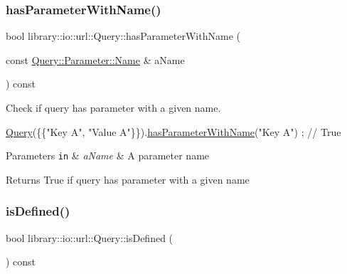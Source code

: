 \subsubsection{\texorpdfstring{has\+Parameter\+With\+Name()}{hasParameterWithName()}}
{\footnotesize\ttfamily bool library\+::io\+::url\+::\+Query\+::has\+Parameter\+With\+Name (\begin{DoxyParamCaption}\item[{const \hyperlink{classlibrary_1_1io_1_1url_1_1_query_1_1_parameter_a7edf5fb8a4ae57aed1ce5dfa2405c981}{Query\+::\+Parameter\+::\+Name} \&}]{a\+Name }\end{DoxyParamCaption}) const}



Check if query has parameter with a given name. 


\begin{DoxyCode}
\hyperlink{classlibrary_1_1io_1_1url_1_1_query_a6781de8f7b7251f8e17c191434b08039}{Query}(\{\{\textcolor{stringliteral}{"Key A"}, \textcolor{stringliteral}{"Value A"}\}\}).\hyperlink{classlibrary_1_1io_1_1url_1_1_query_a19b51e7e6dca5e76284ddf5b62dd4f7f}{hasParameterWithName}(\textcolor{stringliteral}{"Key A"}) ; \textcolor{comment}{// True}
\end{DoxyCode}



\begin{DoxyParams}[1]{Parameters}
\mbox{\tt in}  & {\em a\+Name} & A parameter name \\
\hline
\end{DoxyParams}
\begin{DoxyReturn}{Returns}
True if query has parameter with a given name 
\end{DoxyReturn}
\mbox{\label{classlibrary_1_1io_1_1url_1_1_query_a2f7f9b16e407735269d8e97f12ef9a8b}} 
\subsubsection{\texorpdfstring{is\+Defined()}{isDefined()}}
{\footnotesize\ttfamily bool library\+::io\+::url\+::\+Query\+::is\+Defined (\begin{DoxyParamCaption}{ }\end{DoxyParamCaption}) const}



